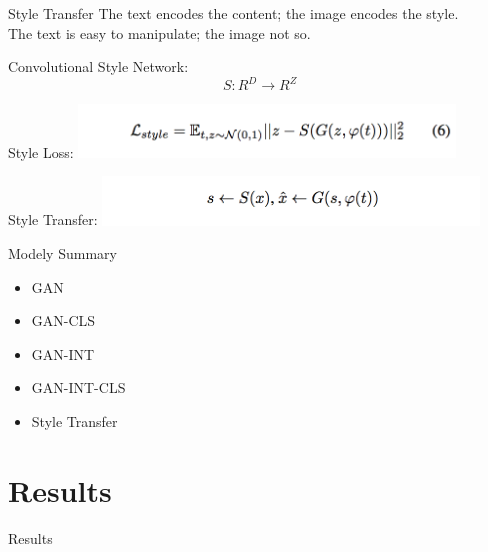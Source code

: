 \documentclass{beamer}
\begin{document}
\begin{frame}{Style Transfer}
The text encodes the content; the image encodes the style. \\
The text is easy to manipulate; the image not so.
\vskip 0.5cm

\begin{block}{Convolutional Style Network:}
$$S: R^D \rightarrow R^Z$$
\end{block}
\vskip 0.5cm

\begin{block}{Style Loss:}
\centering
\includegraphics[width=10cm]{img/reed/style_loss.png}
\end{block}
\vskip 0.5cm

\begin{block}{Style Transfer:}
\centering
\includegraphics[width=10cm]{img/reed/style_transfer.png}
\end{block}

\end{frame}

\begin{frame}{Modely Summary}
\begin{itemize}
\item GAN
\item GAN-CLS
\item GAN-INT
\item GAN-INT-CLS
\item Style Transfer

\end{itemize}

\end{frame}


\section{Results}
\begin{frame}{}
\centering
Results
\end{frame}
\end{document}
